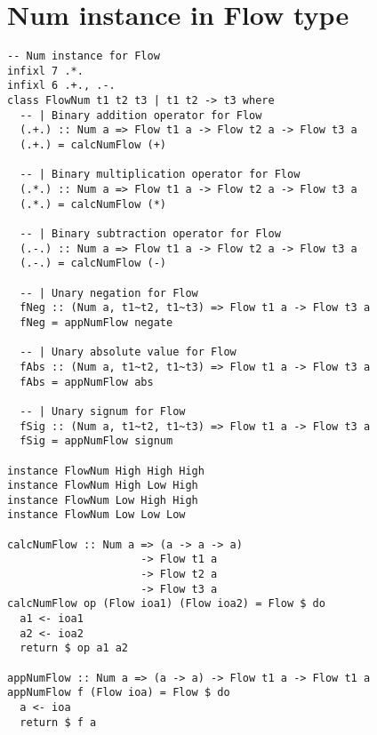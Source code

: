 \chapter{Num instance in Flow type}
\label{app:num_type}
\begin{verbatim}
-- Num instance for Flow
infixl 7 .*.
infixl 6 .+., .-.
class FlowNum t1 t2 t3 | t1 t2 -> t3 where
  -- | Binary addition operator for Flow
  (.+.) :: Num a => Flow t1 a -> Flow t2 a -> Flow t3 a
  (.+.) = calcNumFlow (+)

  -- | Binary multiplication operator for Flow
  (.*.) :: Num a => Flow t1 a -> Flow t2 a -> Flow t3 a
  (.*.) = calcNumFlow (*)

  -- | Binary subtraction operator for Flow
  (.-.) :: Num a => Flow t1 a -> Flow t2 a -> Flow t3 a
  (.-.) = calcNumFlow (-)

  -- | Unary negation for Flow
  fNeg :: (Num a, t1~t2, t1~t3) => Flow t1 a -> Flow t3 a
  fNeg = appNumFlow negate

  -- | Unary absolute value for Flow
  fAbs :: (Num a, t1~t2, t1~t3) => Flow t1 a -> Flow t3 a
  fAbs = appNumFlow abs

  -- | Unary signum for Flow
  fSig :: (Num a, t1~t2, t1~t3) => Flow t1 a -> Flow t3 a
  fSig = appNumFlow signum

instance FlowNum High High High
instance FlowNum High Low High
instance FlowNum Low High High
instance FlowNum Low Low Low

calcNumFlow :: Num a => (a -> a -> a)
                     -> Flow t1 a
                     -> Flow t2 a
                     -> Flow t3 a
calcNumFlow op (Flow ioa1) (Flow ioa2) = Flow $ do
  a1 <- ioa1
  a2 <- ioa2
  return $ op a1 a2

appNumFlow :: Num a => (a -> a) -> Flow t1 a -> Flow t1 a
appNumFlow f (Flow ioa) = Flow $ do
  a <- ioa
  return $ f a
\end{verbatim}
